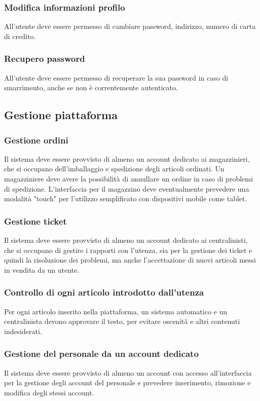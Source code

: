 \documentclass[12pt,a4paper]{article}
\begin{document}
\subsubsection{Modifica informazioni profilo}
All'utente deve essere permesso di cambiare password, indirizzo, numero di carta di credito.

\subsubsection{Recupero password}
All'utente deve essere permesso di recuperare la sua password in caso di smarrimento, anche se non è correntemente autenticato.

\subsection{Gestione piattaforma}

\subsubsection{Gestione ordini}
Il sistema deve essere provvisto di almeno un account dedicato ai magazzinieri, che si occupano dell'imballaggio e spedizione degli articoli ordinati. Un magazziniere deve avere la possibilità di annullare un ordine in caso di problemi di spedizione. L'interfaccia per il magazzino deve eventualmente prevedere una modalità "touch" per l'utilizzo semplificato con dispositivi mobile come tablet.

\subsubsection{Gestione ticket}
Il sistema deve essere provvisto di almeno un account dedicato ai centralinisti, che si occupano di gestire i rapporti con l'utenza, sia per la gestione dei ticket e quindi la risoluzione dei problemi, ma anche l'accettazione di nuovi articoli messi in vendita da un utente.

\subsubsection{Controllo di ogni articolo introdotto dall'utenza}
Per ogni articolo inserito nella piattaforma, un sistema automatico e un centralinista devono approvare il testo, per evitare oscenità e altri contenuti indesiderati.

\subsubsection{Gestione del personale da un account dedicato}
Il sistema deve essere provvisto di almeno un account con accesso all'interfaccia per la gestione degli account del personale e prevedere inserimento, rimozione e modifica degli stessi account.
\end{document}
